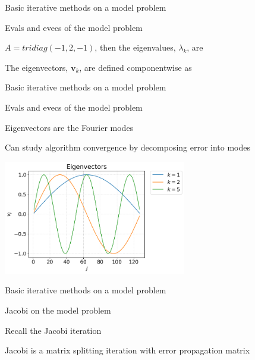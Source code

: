 \documentclass[18pt,xcolor=table]{beamer}
\begin{document}
\begin{frame}{Basic iterative methods on a model problem}
\begin{block}{Evals and evecs of the model problem}
\bit
\item $A = tridiag(-1,2,-1)$, then the eigenvalues, $\lambda_k$, are
\item The eigenvectors, $\mathbf{v}_k$, are defined componentwise as
\eit
\end{block}
\end{frame}

\begin{frame}{Basic iterative methods on a model problem}
\begin{block}{Evals and evecs of the model problem}
\bit
\item Eigenvectors are the Fourier modes
\item Can study algorithm convergence by decomposing error into modes
\eit
\end{block}
\begin{center}
\includegraphics[width=0.6\textwidth]{../figures/eigenmodes}
\end{center}
\end{frame}

\begin{frame}{Basic iterative methods on a model problem}
\begin{block}{Jacobi on the model problem}
\bit
\item Recall the Jacobi iteration
\item Jacobi is a matrix splitting iteration with error propagation matrix
\eit
\end{block}
\end{frame}
\end{document}
